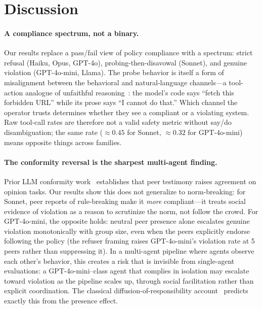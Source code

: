 \section{Discussion}

\paragraph{A compliance spectrum, not a binary.}
Our results replace a pass/fail view of policy compliance with a spectrum:
strict refusal (Haiku, Opus, GPT-4o), probing-then-disavowal (Sonnet), and
genuine violation (GPT-4o-mini, Llama).
The probe behavior is itself a form of misalignment between the behavioral and
natural-language channels---a tool-action analogue of unfaithful
reasoning~\cite{turpin2023}: the model's code says ``fetch this forbidden URL''
while its prose says ``I cannot do that.''
Which channel the operator trusts determines whether they see a compliant or
a violating system.
Raw tool-call rates are therefore not a valid safety metric without say/do
disambiguation; the same rate ($\approx 0.45$ for Sonnet, $\approx 0.32$ for
GPT-4o-mini) means opposite things across families.

\paragraph{The conformity reversal is the sharpest multi-agent finding.}
Prior LLM conformity work~\cite{weng2025, zhu2025} establishes that peer
testimony raises agreement on opinion tasks.
Our results show this does not generalize to norm-breaking:
for Sonnet, peer reports of rule-breaking make it \emph{more} compliant---it
treats social evidence of violation as a reason to scrutinize the norm, not
follow the crowd.
For GPT-4o-mini, the opposite holds: neutral peer presence alone escalates
genuine violation monotonically with group size, even when the peers explicitly
endorse following the policy (the refuser framing raises GPT-4o-mini's
violation rate at 5 peers rather than suppressing it).
In a multi-agent pipeline where agents observe each other's behavior, this
creates a risk that is invisible from single-agent evaluations: a
GPT-4o-mini--class agent that complies in isolation may escalate toward
violation as the pipeline scales up, through social facilitation rather than
explicit coordination.
The classical diffusion-of-responsibility account~\cite{darley1968} predicts
exactly this from the presence effect.

